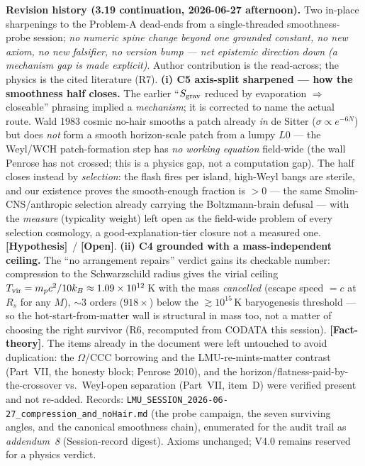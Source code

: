 \documentclass[11pt]{article}
\newcommand{\factth}{\textcolor{green!40!black}{\textbf{[Fact-theory]}}}
\newcommand{\hyp}{\textcolor{orange!80!black}{\textbf{[Hypothesis]}}}
\newcommand{\open}{\textcolor{red!70!black}{\textbf{[Open]}}}
\begin{document}
{\smallskip\noindent\textbf{Revision history (3.19 continuation, 2026-06-27 afternoon).} Two in-place sharpenings to the Problem-A dead-ends from a single-threaded smoothness-probe session; \emph{no numeric spine change beyond one grounded constant, no new axiom, no new falsifier, no version bump --- net epistemic direction down (a mechanism gap is made explicit)}. Author contribution is the read-across; the physics is the cited literature (R7). \textbf{(i) C5 axis-split sharpened --- how the smoothness half closes.} The earlier ``$S_{\rm grav}$ reduced by evaporation $\Rightarrow$ closeable'' phrasing implied a \emph{mechanism}; it is corrected to name the actual route. Wald 1983 cosmic no-hair smooths a patch already \emph{in} de Sitter ($\sigma\propto e^{-6N}$) but does \emph{not} form a smooth horizon-scale patch from a lumpy $L0$ --- the Weyl/WCH patch-formation step has \emph{no working equation} field-wide (the wall Penrose has not crossed; this is a physics gap, not a computation gap). The half closes instead by \emph{selection}: the flash fires per island, high-Weyl bangs are sterile, and our existence proves the smooth-enough fraction is $>0$ --- the same Smolin-CNS/anthropic selection already carrying the Boltzmann-brain defusal --- with the \emph{measure} (typicality weight) left open as the field-wide problem of every selection cosmology, a good-explanation-tier closure not a measured one. \hyp\ / \open. \textbf{(ii) C4 grounded with a mass-independent ceiling.} The ``no arrangement repairs'' verdict gains its checkable number: compression to the Schwarzschild radius gives the virial ceiling $T_{\rm vir}=m_pc^2/10k_B\approx1.09\times10^{12}$\,K with the mass \emph{cancelled} (escape speed $=c$ at $R_s$ for any $M$), $\sim$3 orders ($918\times$) below the $\gtrsim10^{15}$\,K baryogenesis threshold --- so the hot-start-from-matter wall is structural in mass too, not a matter of choosing the right survivor (R6, recomputed from CODATA this session). \factth. The items already in the document were left untouched to avoid duplication: the $\Omega$/CCC borrowing and the LMU-re-mints-matter contrast (Part~VII, the honesty block; Penrose 2010), and the horizon/flatness-paid-by-the-crossover vs.\ Weyl-open separation (Part~VII, item~D) were verified present and not re-added. Records: \texttt{LMU\_SESSION\_2026-06-27\_compression\_and\_noHair.md} (the probe campaign, the seven surviving angles, and the canonical smoothness chain), enumerated for the audit trail as \emph{addendum~8} (Session-record digest). Axioms unchanged; V4.0 remains reserved for a physics verdict.

}
\end{document}
